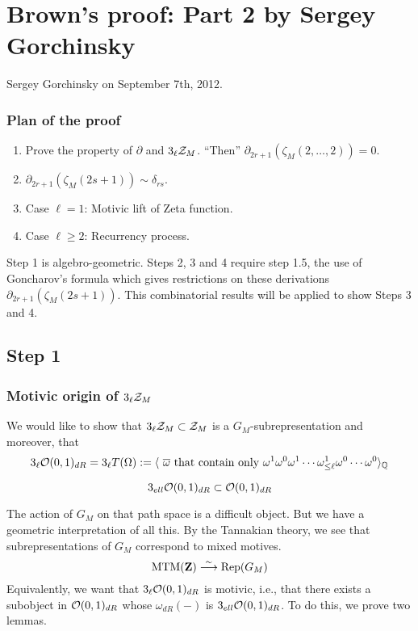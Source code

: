 \chapter{Brown's proof: Part 2 by Sergey Gorchinsky}

Sergey Gorchinsky on September 7th, 2012.

\medskip
\medskip

\subsection{Plan of the proof}
\begin{enumerate}
\item Prove the property of $\partial$ and $3_{\ell} \mathcal{Z}_M$. ``Then'' $\partial_{2r+1}(\zeta_M(2, \ldots, 2)) = 0$.
\item $\partial_{2r+1}(\zeta_M(2s+1)) \sim \delta_{rs}$.
\item Case $\ell = 1$: Motivic lift of Zeta function.
\item Case $\ell \geq 2$: Recurrency process.
\end{enumerate}
Step 1 is algebro-geometric. Steps 2, 3 and 4 require step 1.5, the use of Goncharov's formula which gives restrictions on these derivations $\partial_{2r+1}(\zeta_M(2s+1))$. This combinatorial results will be applied to show Steps 3 and 4.

\section{Step 1}
\subsection{Motivic origin of $3_{\ell} \mathcal{Z}_M$}

We would like to show that $3_{\ell}\mathcal{Z}_M \subset \mathcal{Z}_M$ is a $G_M$-subrepresentation and moreover, that
\[
3_{\ell} \mathcal{O}(0,1)_{dR} = 3_{\ell} T(\Omega) := \langle \textrm{ $\overline{\omega}$ that contain only $\omega^1 \omega^0 \omega^1 \cdots \omega^1_{\leq \ell} \omega^0 \cdots \omega^0$} \rangle_{\mathbb{Q}}
\]
\begin{prop}
\[
3_{ell}\mathcal{O}(0,1)_{dR} \subset \mathcal{O}(0,1)_{dR}
\]
\end{prop}
The action of $G_M$ on that path space is a difficult object. But we have a geometric interpretation of all this. By the Tannakian theory, we see that subrepresentations of $G_M$ correspond to mixed motives.
\[
\mathrm{MTM}(\mathbf{Z}) \stackrel{\sim}{\longrightarrow} \mathrm{Rep}(G_M)
\]
Equivalently, we want that $3_{\ell} \mathcal{O}(0,1)_{dR}$ is motivic, i.e., that there exists a subobject in $\mathcal{O}(0,1)_{dR}$ whose $\omega_{dR}(-)$ is $3_{ell} \mathcal{O}(0,1)_{dR}$. To do this, we prove two lemmas.

